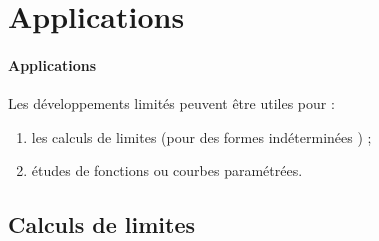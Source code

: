 \section{Applications}

\paragraph{Applications}Les développements limités peuvent être utiles pour : 
\begin{enumerate}
\item les calculs de limites (pour des \og formes indéterminées \fg{}) ;
\item études de fonctions ou courbes paramétrées.
\end{enumerate}

\subsection{Calculs de limites}
